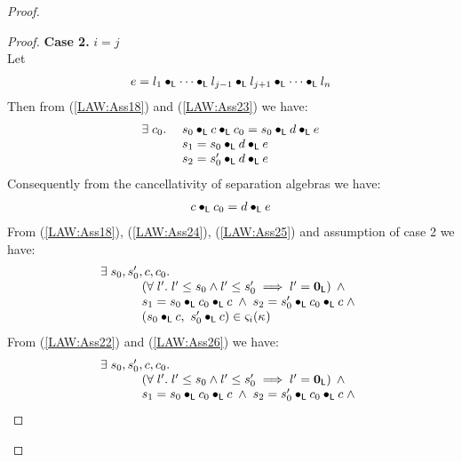 \begin{lemma}[]
\begin{proof}
\begin{proof}
\noindent\textbf{Case 2. }$i = j$\\
Let 
%
\begin{align}
	e = l_1 \bullet_{\textsf{L}} \cdots \bullet_{\textsf{L}} l_{j-1} \bullet_{\textsf{L}} l_{j+1} \bullet_{\textsf{L}} \cdots \bullet_{\textsf{L}} l_n \label{LAW:Ass23}
\end{align}
%
Then from (\ref{LAW:Ass18}) and (\ref{LAW:Ass23}) we have:
%
\begin{align}
	\begin{array}{l l}
		\exists\; c_0.\;  & s_0 \bullet_{\textsf{L}} c \bullet_{\textsf{L}} c_0 = s_0 \bullet_{\textsf{L}} d \bullet_{\textsf{L}} e\\
		& s_1 = s_0 \bullet_{\textsf{L}} d \bullet_{\textsf{L}} e\\
		& s_2 = s'_0 \bullet_{\textsf{L}} d \bullet_{\textsf{L}} e
	\end{array} \label{LAW:Ass24}
\end{align}
%
Consequently from the cancellativity of separation algebras we have:
%
\begin{align}
	c \bullet_{\textsf{L}} c_0 = d \bullet_{\textsf{L}} e \label{LAW:Ass25}
\end{align}
From (\ref{LAW:Ass18}), (\ref{LAW:Ass24}), (\ref{LAW:Ass25}) and assumption of case 2 we have:
%
\begin{align}
	\begin{array}{l}
		\exists\; s_0, s'_0, c, c_0.\; \\
  	\hspace*{1cm}
	  \begin{array}{l}
	  	\left(\forall\; l'.\; l' \leq s_0 \land l' \leq s'_0 \implies l' = \mathbf{0}_{\textsf{L}}\right)\;\land\\
	  	s_1 = s_0 \bullet_{\textsf{L}} c_0 \bullet_{\textsf{L}} c \;\land\; s_2 = s'_0 \bullet_{\textsf{L}} c_0 \bullet_{\textsf{L}} c  \;\land\\
	  	(s_0 \bullet_{\textsf{L}} c,\ s'_0 \bullet_{\textsf{L}} c) \in \varsigma_{i}(\kappa_{}) 
	  \end{array} 
	\end{array} \label{LAW:Ass26}  
\end{align}
From (\ref{LAW:Ass22}) and (\ref{LAW:Ass26}) we have:
%
\begin{align}
	\begin{array}{l}
		\exists\; s_0, s'_0, c, c_0.\; \nonumber\\
  	\hspace*{1cm}
	  \begin{array}{l}
	  	\left(\forall\; l'.\; l' \leq s_0 \land l' \leq s'_0 \implies l' = \mathbf{0}_{\textsf{L}}\right)\;\land\\
	  	s_1 = s_0 \bullet_{\textsf{L}} c_0 \bullet_{\textsf{L}} c \;\land\; s_2 = s'_0 \bullet_{\textsf{L}} c_0 \bullet_{\textsf{L}} c  \;\land\\

\end{array}
\end{array}
\end{align}
\end{proof}
\end{proof}
\end{lemma}
